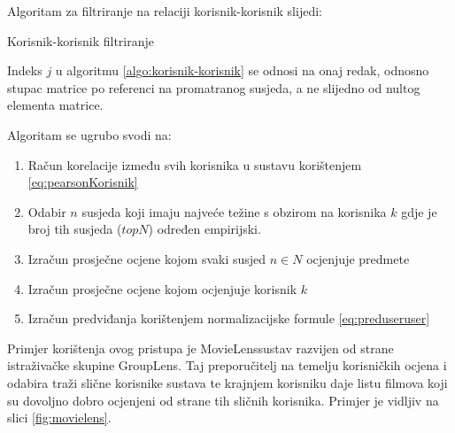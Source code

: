 \documentclass[times, utf8, diplomski, numeric]{fer}
\begin{document}
Algoritam za filtriranje na relaciji korisnik-korisnik slijedi:
\begin{algorithm}[!htbp]
	\caption{Korisnik-korisnik filtriranje}
	\label{algo:korisnik-korisnik}
	\begin{algorithmic}[1]
		
		
		
			\ENDFOR
		\ENDFOR
	\end{algorithmic}
\end{algorithm}
Indeks $j$ u algoritmu \ref{algo:korisnik-korisnik} se odnosi na onaj redak,
odnosno stupac matrice po referenci na promatranog susjeda, a ne slijedno od
nultog elementa matrice.

Algoritam se ugrubo svodi na:
\begin{enumerate}
  \item Račun korelacije između svih korisnika u sustavu korištenjem
  \ref{eq:pearsonKorisnik}
  \item Odabir $n$ susjeda koji imaju najveće težine s obzirom na korisnika $k$
  gdje je broj tih susjeda ($topN$) određen empirijski.
  \item Izračun prosječne ocjene kojom svaki susjed $n \in N$ ocjenjuje predmete
  \item Izračun prosječne ocjene kojom ocjenjuje korisnik $k$
  \item Izračun predviđanja korištenjem normalizacijske formule
  \ref{eq:preduseruser}
\end{enumerate}

Primjer korištenja ovog pristupa je \glqq MovieLens\grqq sustav razvijen od
strane istraživačke skupine \glqq GroupLens\grqq \cite{MovieLens}. Taj
preporučitelj na temelju korisničkih ocjena i odabira traži slične korisnike
sustava te krajnjem korisniku daje listu filmova koji su dovoljno dobro
ocjenjeni od strane tih sličnih korisnika. Primjer je vidljiv na slici
\ref{fig:movielens}.
\end{document}
